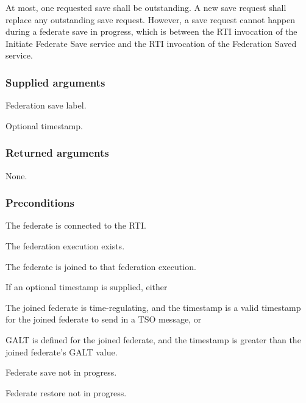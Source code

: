 At most, one requested save shall be outstanding. A new save request shall replace any outstanding save request. However, a save request cannot happen during a federate save in progress, which is between the RTI invocation of the Initiate Federate Save \rtiinitiated{} service and the RTI invocation of the Federation Saved \rtiinitiated{} service.

\subsubsection{Supplied arguments}

\begin{stdalphalist}
    \item Federation save label.
    \item Optional timestamp.
\end{stdalphalist}

\subsubsection{Returned arguments}

\begin{stdalphalist}
    \item None.
\end{stdalphalist}

\subsubsection{Preconditions}

\begin{stdalphalist}
    \item The federate is connected to the RTI.
    \item The federation execution exists.
    \item The federate is joined to that federation execution.
    \item If an optional timestamp is supplied, either
    \begin{stdnumlist}
        \item The joined federate is time-regulating, and the timestamp is a valid timestamp for the joined federate to send in a TSO message, or
        \item GALT is defined for the joined federate, and the timestamp is greater than the joined federate's GALT value.
    \end{stdnumlist}
    \item Federate save not in progress.
    \item Federate restore not in progress.
\end{stdalphalist}

